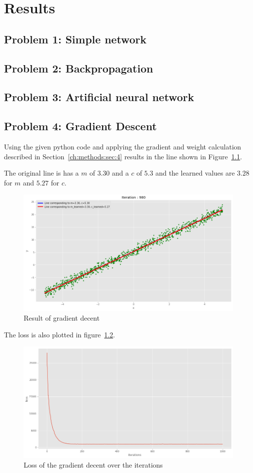 \chapter{Results}
\section{Problem 1: Simple network}
\section{Problem 2: Backpropagation}
\section{Problem 3: Artificial neural network}
\section{Problem 4: Gradient Descent}

Using the given python code and applying the gradient and weight calculation described in Section~\ref{ch:methods:sec:4} results in the line shown in Figure~\ref{problem4_result}.

The original line is has a $m$ of $3.30$ and a $c$ of $5.3$ and the learned values are $3.28$ for $m$ and $5.27$ for $c$.

\begin{figure}[h]
	\centering
    \includegraphics[width=17cm]{img/problem4_result.png}
	\caption{Result of gradient decent}
    \label{problem4_result}
\end{figure}

The loss is also plotted in figure~\ref{problem4_result_loss}.

\begin{figure}[h]
	\centering
    \includegraphics[width=17cm]{img/problem4_result_loss.png}
    \caption{Loss of the gradient decent over the iterations}
    \label{problem4_result_loss}
\end{figure}
